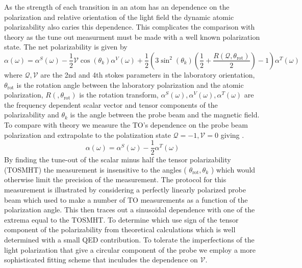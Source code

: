 \documentclass[aps,prl,
,reprint,
superscriptaddress,
onecolumn,
showpacs,preprintnumbers,
 amsmath,amssymb,
]{revtex4-1}
\begin{document}
As the strength of each transition in an atom has an dependence on the polarization and relative orientation of the light field the dynamic atomic polarizability also caries this dependence. This complicates the comparison with theory as the tune out measurment must be made with a well known polarization state. The net polarizability is given by 
\begin{equation}
    \alpha(\omega) = \alpha^S(\omega) - 
    \frac{1}{2} \mathcal{V} \cos \left( \theta_k \right) \alpha^V(\omega) + 
    \frac{1}{2} \left(3 \sin^2\left( \theta_k \right) \left(\frac{1}{2} +  \frac{R(\mathcal{Q},\theta_{\text{rot}})}{2}\right) -1 \right) \alpha^T(\omega) 
    \label{eq:polarizability_full}
\end{equation}
where \(\mathcal{Q}, \mathcal{V}\) are the 2nd and 4th stokes parameters in the laboratory orientation, \(\theta_{\text{rot}}\) is the rotation angle between the laboratory polarization and the atomic polarization, \( R(,\theta_{\text{rot}}) \) is the rotation transform, \(\alpha^S(\omega),\alpha^V(\omega),\alpha^T(\omega)\) are the frequency dependent scalar vector and tensor components of the polarizability and \( \theta_k\) is the angle between the probe beam and the magnetic field. 
To compare with theory we measure the TO's dependence on the probe beam polarization and extrapolate to the polatization state \( \mathcal{Q}=-1, \mathcal{V} =0 \) giving . 
\begin{equation}
    \alpha(\omega) = \alpha^S(\omega) - \frac{1}{2} \alpha^T(\omega) 
    \label{eq:polarizability_full}
\end{equation}
By finding the tune-out of the scalar minus half the tensor polarizability (TOSMHT) the measurement is insensitive to the angles ( \(\theta_{\text{rot}}, \theta_k \) ) which would otherwise limit the precision of the measurement.
The protocol for this measurement is illustrated by considering a perfectly linearly polarized probe beam which used to make a number of TO measurements as a function of the polarization angle. This then traces out a sinusoidal dependence with one of the extrema equal to the TOSMHT. %
To determine which use sign of the tensor component of the polarizability from theoretical calculations which is well determined with a small QED contribution. 
To tolerate the imperfections of the light polarization that give a circular component of the probe we employ a more sophisticated fitting scheme that inculudes the dependence on \( \mathcal{V} \).
\end{document}
